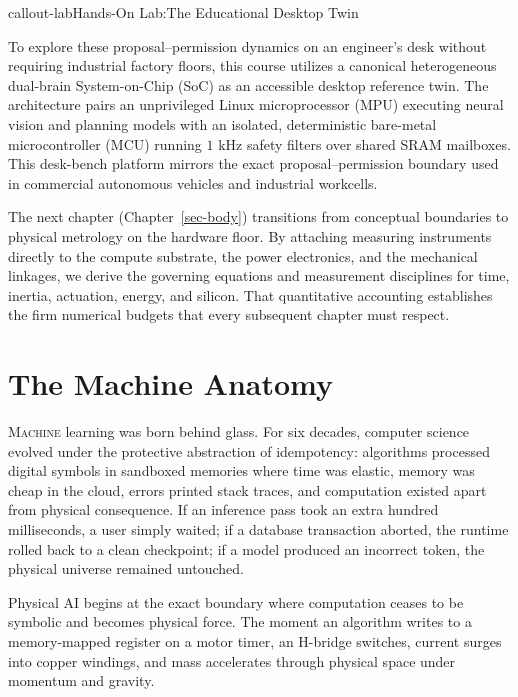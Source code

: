 \documentclass[
  10pt,
  letterpaper,
  twoside,
  openright,
  numbers=noenddot,
  headings=standardclasses
]{scrbook}
\begin{document}
\protect{}\label{callout-labux2a-1.11}
\begin{fbxSimple}{callout-lab}{Hands-On Lab:}{The Educational Desktop Twin}
\label{callout-lab*-1.11}

To explore these proposal--permission dynamics on an engineer's desk
without requiring industrial factory floors, this course utilizes a
canonical heterogeneous dual-brain System-on-Chip (SoC) as an accessible
desktop reference twin. The architecture pairs an unprivileged Linux
microprocessor (MPU) executing neural vision and planning models with an
isolated, deterministic bare-metal microcontroller (MCU) running
\(1\text{ kHz}\) safety filters over shared SRAM mailboxes. This
desk-bench platform mirrors the exact proposal--permission boundary used
in commercial autonomous vehicles and industrial workcells.

\end{fbxSimple}

The next chapter (Chapter~\ref{sec-body}) transitions from conceptual
boundaries to physical metrology on the hardware floor. By attaching
measuring instruments directly to the compute substrate, the power
electronics, and the mechanical linkages, we derive the governing
equations and measurement disciplines for time, inertia, actuation,
energy, and silicon. That quantitative accounting establishes the firm
numerical budgets that every subsequent chapter must respect.

\part{The Machine Anatomy}

\lettrine{M}{achine} learning was born behind glass. For six decades,
computer science evolved under the protective abstraction of
idempotency: algorithms processed digital symbols in sandboxed memories
where time was elastic, memory was cheap in the cloud, errors printed
stack traces, and computation existed apart from physical consequence.
If an inference pass took an extra hundred milliseconds, a user simply
waited; if a database transaction aborted, the runtime rolled back to a
clean checkpoint; if a model produced an incorrect token, the physical
universe remained untouched.

Physical AI begins at the exact boundary where computation ceases to be
symbolic and becomes physical force. The moment an algorithm writes to a
memory-mapped register on a motor timer, an H-bridge switches, current
surges into copper windings, and mass accelerates through physical space
under momentum and gravity.
\end{document}
